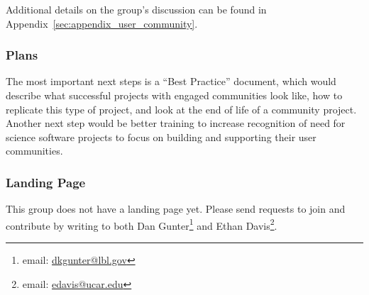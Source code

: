 Additional details on the group's discussion can be found in
Appendix~\ref{sec:appendix_user_community}.

\subsubsection{Plans}

The most important next steps is a ``Best Practice'' document, which would
describe what successful projects with engaged communities look like, how to
replicate this type of project, and look at the end of life of a community project.
Another next step would be better training to increase recognition of need for science software
projects to focus on building and supporting their user communities.

\subsubsection{Landing Page}

This group does not have a landing page yet. Please send requests to join and
contribute by writing to both Dan Gunter\footnote{email:
\href{mailto:dkgunter@lbl.gov}{dkgunter@lbl.gov}} and Ethan
Davis\footnote{email: \href{mailto:edavis@ucar.edu}{edavis@ucar.edu}}.
